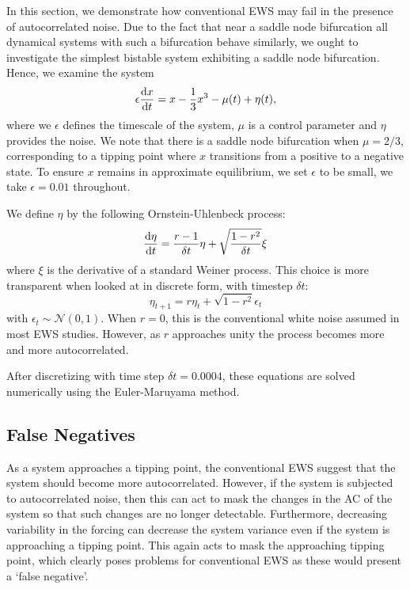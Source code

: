 In this section, we demonstrate how conventional EWS may fail in the presence of autocorrelated  noise. Due to the fact that near a
saddle node bifurcation all dynamical systems with such a
bifurcation behave similarly\cite{guckenheimer2013}, we ought to
investigate the simplest bistable system exhibiting a saddle node
bifurcation. Hence, we examine the system 
\begin{equation}
    \label{eq:dynamical_system}
    \epsilon\dv{x}{t} =  x - \frac{1}{3}x^3 - \mu(t) + \eta(t),
\end{equation}
where we $\epsilon$ defines the timescale of the system, $\mu$ is a control parameter and $\eta$ provides the noise. We note that there is a saddle node bifurcation
when $\mu = 2/3$, corresponding to a tipping point where
$x$ transitions from a positive to a negative state. To ensure
$x$ remains in approximate equilibrium, we set $\epsilon$ to be small,
we take $\epsilon = 0.01$ throughout.


We define $\eta$ by the following Ornstein-Uhlenbeck process\cite{Uhlenbeck1930}:
\begin{equation}
\label{eq:white_red_forcing}
    \dv{\eta}{t} = \frac{r-1}{\delta t}\eta + \sqrt{\frac{1-r^2}{\delta t}} \xi
\end{equation}
where $\xi$ is the derivative of a standard Weiner process. 
This choice is more transparent when looked at in discrete form, with timestep 
$\delta t$:
\begin{equation}
    \label{eq:discretized_white_or_red_noise}
    \eta_{t+1} = r\eta_t + \sqrt{1-r^2} \epsilon_t
\end{equation}
with $\epsilon_t \sim \mathcal{N}(0,1)$. When $r = 0$, this is 
the conventional white noise assumed in most EWS
studies. However, as $r$ approaches unity the process becomes
more and more autocorrelated.

After discretizing with time step $\delta t = 0.0004$,
these equations are solved numerically using the 
Euler-Maruyama method\cite{Jacobs2010}.


\subsection{False Negatives}
As a system approaches a tipping point, the conventional
EWS suggest that the system should become more
autocorrelated. However, if the system is subjected to autocorrelated noise,
then this can act to mask the changes in the AC of the system so that such
changes are no longer detectable. Furthermore, decreasing variability in
the forcing can decrease the system variance even if the system is 
approaching a tipping point. This again acts to mask the approaching tipping point, which clearly poses problems for conventional
EWS as these would present a `false negative'.

